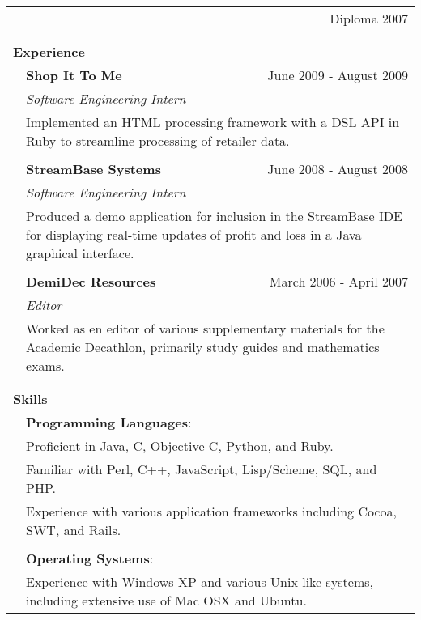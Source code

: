 \documentclass{article}
\begin{document}
\begin{tabular}{llr}
& \vspace{2mm}{\bf James A. Garfield Computer Science Magnet} & Diploma 2007 \\ 
\\
\cline{2-3}\\
\multicolumn{2}{l}{{\large\bf Experience}  \vspace{1mm}}& \\
& {\bf Shop It To Me} & June 2009 - August 2009\\
& \multicolumn{2}{l}{\emph{   Software Engineering Intern}} \\
& \multicolumn{2}{p{6in}}{Implemented an HTML processing framework with a DSL API in Ruby to streamline processing of retailer data.}\\\\
& {\bf StreamBase Systems} & June 2008 - August 2008\\
& \multicolumn{2}{l}{\emph{   Software Engineering Intern}} \\
& \multicolumn{2}{p{6in}}{Produced a demo application for inclusion in the StreamBase IDE for displaying real-time updates of profit and loss in a Java graphical interface.} \\\\
& {\bf DemiDec Resources} & March 2006 - April 2007 \\
& \multicolumn{2}{l}{\emph{   Editor}} \\
& \multicolumn{2}{p{6in}}{Worked as en editor of various supplementary materials for the Academic Decathlon, primarily study guides and mathematics exams.} \\\\
\cline{2-3}\\
\multicolumn{2}{l}{{\large\bf Skills} \vspace{1mm} }& \\
& {\bf Programming Languages}:\\
& \multicolumn{2}{p{6in}}{
Proficient in Java, C, Objective-C, Python, and Ruby.
} \\
& \multicolumn{2}{p{6in}}{
Familiar with Perl, C++, JavaScript, Lisp/Scheme, SQL, and PHP.
} \\
& \multicolumn{2}{p{6in}}{
Experience with various application frameworks including Cocoa, SWT, and Rails.
}\\\\
& {\bf Operating Systems}:\\
& \multicolumn{2}{p{6in}}{
Experience with Windows XP and various Unix-like systems, including extensive use of Mac OSX and Ubuntu.
}
\end{tabular}
\end{document}
